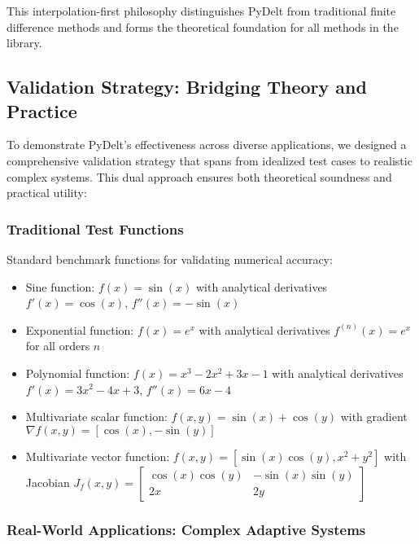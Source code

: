 \documentclass[10pt,journal,compsoc]{IEEEtran}
\begin{document}
This interpolation-first philosophy distinguishes PyDelt from traditional finite difference methods and forms the theoretical foundation for all methods in the library.

\subsection{Validation Strategy: Bridging Theory and Practice}

To demonstrate PyDelt's effectiveness across diverse applications, we designed a comprehensive validation strategy that spans from idealized test cases to realistic complex systems. This dual approach ensures both theoretical soundness and practical utility:

\subsubsection{Traditional Test Functions}

Standard benchmark functions for validating numerical accuracy:
\begin{itemize}
    \item Sine function: $f(x) = \sin(x)$ with analytical derivatives $f'(x) = \cos(x)$, $f''(x) = -\sin(x)$
    
    \item Exponential function: $f(x) = e^x$ with analytical derivatives $f^{(n)}(x) = e^x$ for all orders $n$
    
    \item Polynomial function: $f(x) = x^3 - 2x^2 + 3x - 1$ with analytical derivatives $f'(x) = 3x^2 - 4x + 3$, $f''(x) = 6x - 4$
    
    \item Multivariate scalar function: $f(x,y) = \sin(x) + \cos(y)$ with gradient $\nabla f(x,y) = [\cos(x), -\sin(y)]$
    
    \item Multivariate vector function: $f(x,y) = [\sin(x)\cos(y), x^2 + y^2]$ with Jacobian $J_f(x,y) = \begin{bmatrix} \cos(x)\cos(y) & -\sin(x)\sin(y) \\ 2x & 2y \end{bmatrix}$
\end{itemize}

\subsubsection{Real-World Applications: Complex Adaptive Systems}
\end{document}
